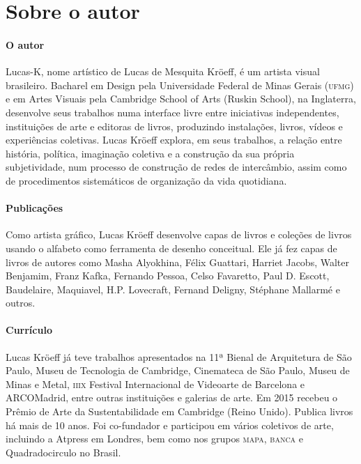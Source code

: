 \documentclass[11pt]{extarticle}
\begin{document}
\section{Sobre o autor}


\paragraph{O autor} Lucas-K, nome artístico de Lucas de Mesquita Kröeff, é um artista visual brasileiro. Bacharel em Design pela Universidade Federal de Minas Gerais (\textsc{ufmg}) e em Artes Visuais pela Cambridge School of Arts (Ruskin School), na Inglaterra, desenvolve seus trabalhos numa interface livre entre iniciativas independentes, instituições de arte e editoras de livros, produzindo instalações, livros, vídeos e experiências coletivas.
Lucas Kröeff explora, em seus trabalhos, a relação entre história, política, imaginação coletiva e a construção da sua própria subjetividade, num processo de construção de redes de intercâmbio, assim como de procedimentos sistemáticos de organização da vida quotidiana.

\paragraph{Publicações} Como artista gráfico, Lucas Kröeff desenvolve capas de livros e coleções de livros usando o alfabeto como ferramenta de desenho conceitual. Ele já fez capas de livros de autores como Masha Alyokhina, Félix Guattari, Harriet Jacobs, Walter Benjamim, Franz Kafka, Fernando Pessoa, Celso Favaretto, Paul D. Escott, Baudelaire, Maquiavel, H.P. Lovecraft, Fernand Deligny, Stéphane Mallarmé e outros.

\paragraph{Currículo} Lucas Kröeff já teve trabalhos apresentados na 11ª Bienal de Arquitetura de São Paulo, Museu de Tecnologia de Cambridge, Cinemateca de São Paulo, Museu de Minas e Metal, \textsc{iiix} Festival Internacional de Videoarte de Barcelona e ARCOMadrid, entre outras instituições e galerias de arte. Em 2015 recebeu o Prêmio de Arte da Sustentabilidade em Cambridge (Reino Unido). Publica livros há mais de 10 anos.
Foi co-fundador e participou em vários coletivos de arte, incluindo a Atpress em Londres, bem como nos grupos \textsc{mapa}, \textsc{banca} e Quadradocirculo no Brasil.
\end{document}
